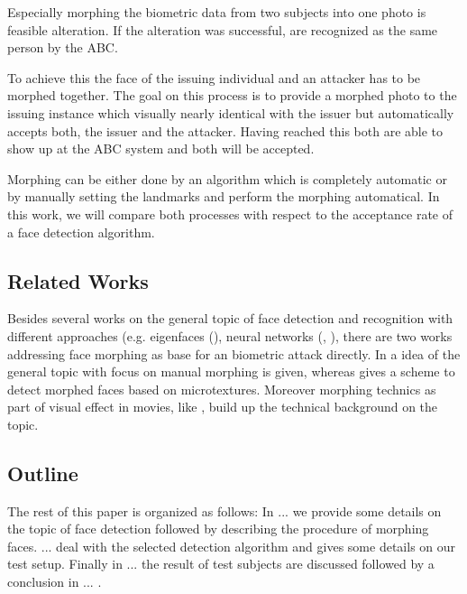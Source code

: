 Especially morphing the biometric data from two subjects into one photo is feasible alteration. If the alteration was successful, are recognized as the same person by the ABC. 

To achieve this the face of the issuing individual and an attacker has to be morphed together. The goal on this process is to provide a morphed photo to the issuing instance which visually nearly identical with the issuer but automatically accepts both, the issuer and the attacker. Having reached this both are able to show up at the ABC system and both will be accepted. 

Morphing can be either done by an algorithm which is completely automatic or by manually setting the landmarks and perform the morphing automatical. In this work, we will compare both processes with respect to the acceptance rate of a face detection algorithm. 

\subsection{Related Works}
Besides several works on the general topic of face detection \cite{jagathishwaran2014survey} and recognition with different approaches (e.g. eigenfaces (\cite{turk1991face}), neural networks (\cite{rowley1998neural}, \cite{lawrence1997face}), there are two works addressing face morphing as base for an biometric attack directly. In \cite{ferrara2014magic} a idea of the general topic with focus on manual morphing is given, whereas \cite{raghavendra2016detecting} gives a scheme to detect morphed faces based on microtextures.
Moreover morphing technics as part of visual effect in movies, like \cite{wolberg1998image}, build up the technical background on the topic. 

\subsection{Outline}
The rest of this paper is organized as follows: In ... we provide some details on the topic of face detection followed by describing the procedure of morphing faces. ... deal with the selected detection algorithm and gives some details on our test setup. Finally in ... the result of test subjects are discussed followed by a conclusion in ... .
 